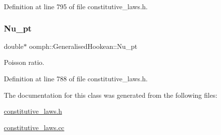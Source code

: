Definition at line 795 of file constitutive\+\_\+laws.\+h.

\mbox{\label{classoomph_1_1GeneralisedHookean_ad719ee5ed6d1bcacb18fec3339ae98de}} 
\subsubsection{\texorpdfstring{Nu\+\_\+pt}{Nu\_pt}}
{\footnotesize\ttfamily double$\ast$ oomph\+::\+Generalised\+Hookean\+::\+Nu\+\_\+pt\hspace{0.3cm}{\ttfamily [private]}}



Poisson ratio. 



Definition at line 788 of file constitutive\+\_\+laws.\+h.



The documentation for this class was generated from the following files\+:\begin{DoxyCompactItemize}
\item 
\hyperlink{constitutive__laws_8h}{constitutive\+\_\+laws.\+h}\item 
\hyperlink{constitutive__laws_8cc}{constitutive\+\_\+laws.\+cc}\end{DoxyCompactItemize}
